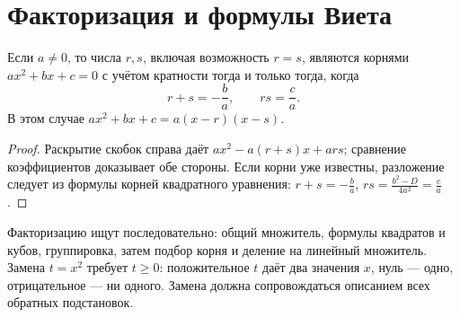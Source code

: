 \section{Факторизация и формулы Виета}
\begin{theorem}
Если \(a\ne0\), то числа \(r,s\), включая возможность \(r=s\), являются корнями \(ax^2+bx+c=0\) с учётом кратности тогда и только тогда, когда
\[
r+s=-\frac ba,\qquad rs=\frac ca.
\]
В этом случае \(ax^2+bx+c=a(x-r)(x-s)\).
\end{theorem}
\begin{proof}Раскрытие скобок справа даёт \(ax^2-a(r+s)x+ars\); сравнение коэффициентов доказывает обе стороны. Если корни уже известны, разложение следует из формулы корней квадратного уравнения: \(r+s=-\frac ba\), \(rs=\frac{b^2-D}{4a^2}=\frac ca\).\end{proof}
Факторизацию ищут последовательно: общий множитель, формулы квадратов и кубов, группировка, затем подбор корня и деление на линейный множитель. Замена \(t=x^2\) требует \(t\geq0\): положительное \(t\) даёт два значения \(x\), нуль — одно, отрицательное — ни одного. Замена должна сопровождаться описанием всех обратных подстановок.

